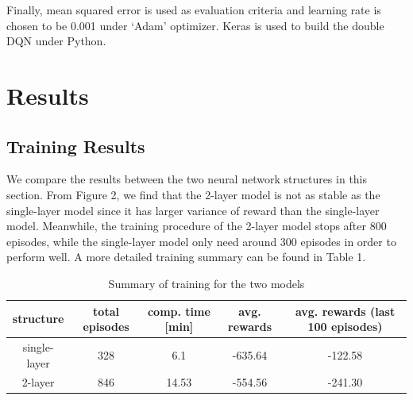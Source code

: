 \documentclass[11pt]{article}
\begin{document}
Finally, mean squared error is used as evaluation criteria and learning rate is chosen to be 0.001 under `Adam' optimizer. Keras is used to build the double DQN under Python.



\section{Results}

\subsection{Training Results}

We compare the results between the two neural network structures in this section. From Figure 2, we find that the 2-layer model is not as stable as the single-layer model since it has larger variance of reward than the single-layer model. Meanwhile, the training procedure of the 2-layer model stops after 800 episodes, while the single-layer model only need around 300 episodes in order to perform well. A more detailed training summary can be found in Table 1.


\begin{table}[h]
\begin{center}
\vspace{1mm}
\begin{tabular}{ccccc}
\hline
 \hline
structure & total episodes &  comp. time [min]  & avg. rewards & avg. rewards (last 100 episodes)   \\
 \hline 
single-layer & 328 & 6.1 & -635.64 & -122.58 \\
2-layer & 846 & 14.53 & -554.56 & -241.30 \\
 \hline
 \hline
\end{tabular}
\end{center}
\vspace{-1em}
\caption{Summary of training for the two models}
\end{table}
\end{document}
